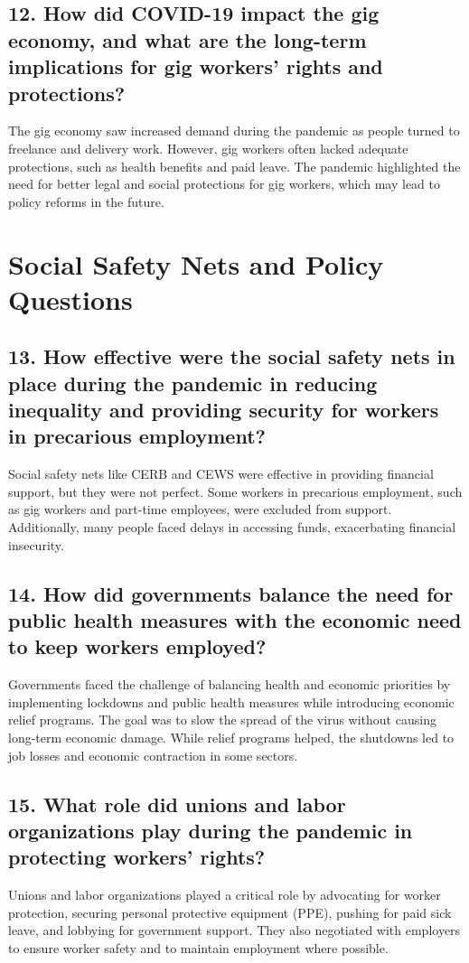 \documentclass[12pt]{article}
\begin{document}
\subsection*{12. How did COVID-19 impact the gig economy, and what are the long-term implications for gig workers' rights and protections?}
The gig economy saw increased demand during the pandemic as people turned to freelance and delivery work. However, gig workers often lacked adequate protections, such as health benefits and paid leave. The pandemic highlighted the need for better legal and social protections for gig workers, which may lead to policy reforms in the future.

\section*{Social Safety Nets and Policy Questions}

\subsection*{13. How effective were the social safety nets in place during the pandemic in reducing inequality and providing security for workers in precarious employment?}
Social safety nets like CERB and CEWS were effective in providing financial support, but they were not perfect. Some workers in precarious employment, such as gig workers and part-time employees, were excluded from support. Additionally, many people faced delays in accessing funds, exacerbating financial insecurity.

\subsection*{14. How did governments balance the need for public health measures with the economic need to keep workers employed?}
Governments faced the challenge of balancing health and economic priorities by implementing lockdowns and public health measures while introducing economic relief programs. The goal was to slow the spread of the virus without causing long-term economic damage. While relief programs helped, the shutdowns led to job losses and economic contraction in some sectors.

\subsection*{15. What role did unions and labor organizations play during the pandemic in protecting workers’ rights?}
Unions and labor organizations played a critical role by advocating for worker protection, securing personal protective equipment (PPE), pushing for paid sick leave, and lobbying for government support. They also negotiated with employers to ensure worker safety and to maintain employment where possible.
\end{document}
